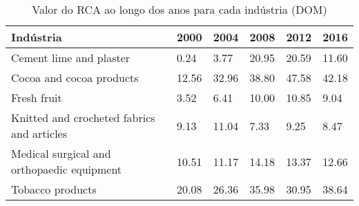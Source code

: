 \begin{table}
\centering
\caption{Valor do RCA ao longo dos anos para cada indústria (DOM)}
\begin{tabular}{p{6cm}p{1.5cm}p{1.5cm}p{1.5cm}p{1.5cm}p{1.5cm}}
\toprule
                                 Indústria &  2000 &  2004 &  2008 &  2012 &  2016 \\
\midrule
                   Cement lime and plaster &  0.24 &  3.77 & 20.95 & 20.59 & 11.60 \\
                  Cocoa and cocoa products & 12.56 & 32.96 & 38.80 & 47.58 & 42.18 \\
                               Fresh fruit &  3.52 &  6.41 & 10.00 & 10.85 &  9.04 \\
Knitted and crocheted fabrics and articles &  9.13 & 11.04 &  7.33 &  9.25 &  8.47 \\
Medical surgical and orthopaedic equipment & 10.51 & 11.17 & 14.18 & 13.37 & 12.66 \\
                          Tobacco products & 20.08 & 26.36 & 35.98 & 30.95 & 38.64 \\
\bottomrule
\end{tabular}
\end{table}
